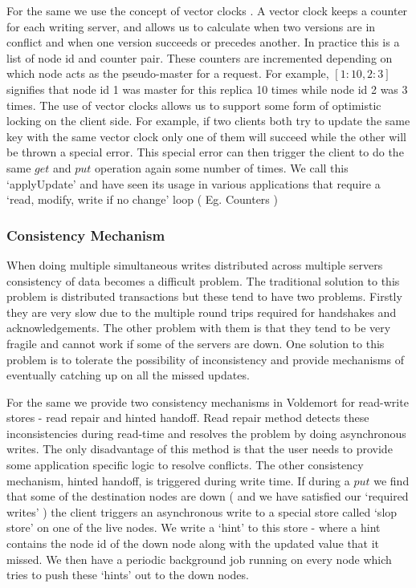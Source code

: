 \documentclass[10pt,twocolumn,preprint,natbib,authoryear]{sigplanconf}
\begin{document}
For the same we use the concept of vector clocks \cite{Time, clocks, and the ordering of events in a distributed system}. A vector clock keeps a counter for each writing server, and allows us to calculate when two versions are in conflict and when one version succeeds or precedes another. In practice this is a list of node id and counter pair. These counters are incremented depending on which node acts as the pseudo-master for a request. For example,  $[1:10,2:3]$ signifies that node id 1 was master for this replica 10 times while node id 2 was 3 times. The use of vector clocks allows us to support some form of optimistic locking on the client side. For example, if two clients both try to update the same key with the same vector clock only one of them will succeed while the other will be thrown a special error. This special error can then trigger the client to do the same $get$ and $put$ operation again some number of times. We call this `applyUpdate' and have seen its usage in various applications that require a `read, modify, write if no change' loop ( Eg. Counters )


\subsubsection {Consistency Mechanism }
\label{sec:system_architecture:system_components:consistency_mechanism}

When doing multiple simultaneous writes distributed across multiple servers consistency of data becomes a difficult problem. The traditional solution to this problem is distributed transactions but these tend to have two problems. Firstly they are very slow due to the multiple round trips required for handshakes and acknowledgements. The other problem with them is that they tend to be very fragile and cannot work if some of the servers are down. One solution to this problem is to tolerate the possibility of inconsistency and provide mechanisms of eventually catching up on all the missed updates. 

For the same we provide two consistency mechanisms in Voldemort for read-write stores - read repair and hinted handoff. Read repair method detects these inconsistencies during read-time and resolves the problem by doing asynchronous writes. The only disadvantage of this method is that the user needs to provide some application specific logic to resolve conflicts. The other consistency mechanism, hinted handoff, is triggered during write time. If during a $put$ we find that some of the destination nodes are down ( and we have  satisfied our `required writes' ) the client triggers an asynchronous write to a special store called `slop store' on one of the live nodes. We write a `hint' to this store - where a hint contains the node id of the down node along with the updated value that it missed. We then have a periodic background job running on every node which tries to push these `hints' out to the down nodes.
\end{document}
